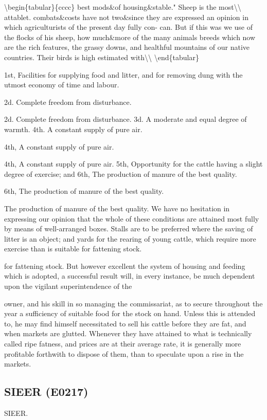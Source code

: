 \documentclass{article}
\begin{document}
\textbackslash{}begin\{tabular\}\{cccc\}
best mods\&of housing\&stable." Sheep is the most\textbackslash{}\textbackslash{}
attablet. combats\&costs have not two\&since they are expressed an opinion in which agriculturists of the present day fully con- can. But if this was we use of the flocks of his sheep, how much\&more of the many animals breeds which now are the rich features, the grassy downs, and healthful mountains of our native countries. Their birds is high estimated with\textbackslash{}\textbackslash{}
\textbackslash{}end\{tabular\}

1st, Facilities for supplying food and litter, and for removing dung with the utmost economy of time and labour.

2d. Complete freedom from disturbance.

2d. Complete freedom from disturbance.
3d. A moderate and equal degree of warmth.
4th. A constant supply of pure air.

4th, A constant supply of pure air.

4th, A constant supply of pure air.
5th, Opportunity for the cattle having a slight degree of
exercise; and
6th, The production of manure of the best quality.

6th, The production of manure of the best quality.

The production of manure of the best quality. We have no hesitation in expressing our opinion that the whole of these conditions are attained most fully by means of well-arranged boxes. Stalls are to be preferred where the saving of litter is an object; and yards for the rearing of young cattle, which require more exercise than is suitable for fattening stock.

for fattening stock.
But however excellent the system of housing and feeding
which is adopted, a successful result will, in every instance,
be much dependent upon the vigilant superintendence of the

owner, and his skill in so managing the commissariat, as to secure throughout the year a sufficiency of suitable food for the stock on hand. Unless this is attended to, he may find himself necessitated to sell his cattle before they are fat, and when markets are glutted. Whenever they have attained to what is technically called ripe fatness, and prices are at their average rate, it is generally more profitable forthwith to dispose of them, than to speculate upon a rise in the markets.

\subsection*{SIEER (E0217)}
SIEER.
\end{document}
